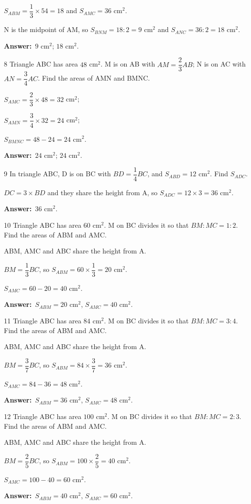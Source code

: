 \documentclass[11pt]{article}
\newif\ifsol \solfalse
\providecommand{\AnsWord}{Đáp số}
\newcommand{\dapso}[1]{\par\textbf{\AnsWord:}\ #1}
\newcommand{\probsol}[1]{%
  \begin{lrbox}{\solmeasure}\begin{minipage}{\dimexpr\linewidth-24pt\relax}#1\end{minipage}\end{lrbox}%
  \ifsol
    \begin{solbox}#1\end{solbox}%
  \else
    \setlength{\solht}{\dimexpr\ht\solmeasure+\dp\solmeasure+0.85cm\relax}%
    \ifdim\solht<1.35cm\setlength{\solht}{1.35cm}\fi
    \begin{tcolorbox}[colback=white,colframe=Line,boxrule=0.8pt,arc=5pt,
      left=8pt,right=8pt,top=4pt,bottom=4pt,height=\solht]{\footnotesize\color{Slate}\itshape\WorkWord}\end{tcolorbox}%
  \fi}
\newcommand{\gap}{\vspace{0.3cm}}
\def\WorkWord{Your work:}
\def\AnsWord{Answer}
\begin{document}
\probsol{
$S_{ABM}=\dfrac13\times54=18$ and $S_{AMC}=36$ cm$^2$.\par N is the midpoint of AM, so $S_{BNM}=18:2=9$ cm$^2$ and $S_{ANC}=36:2=18$ cm$^2$.
\dapso{$9$ cm$^2$; $18$ cm$^2$.}}
\gap
\begin{probbox}{8}{\relax}
Triangle ABC has area $48$ cm$^2$. M is on AB with $AM=\dfrac23AB$; N is on AC with $AN=\dfrac34AC$. Find the areas of AMN and BMNC.
\end{probbox}
\probsol{
$S_{AMC}=\dfrac23\times48=32$ cm$^2$;\par $S_{AMN}=\dfrac34\times32=24$ cm$^2$;\par $S_{BMNC}=48-24=24$ cm$^2$.
\dapso{$24$ cm$^2$; $24$ cm$^2$.}}
\gap
\begin{probbox}{9}{\relax}
In triangle ABC, D is on BC with $BD=\dfrac14BC$, and $S_{ABD}=12$ cm$^2$. Find $S_{ADC}$.
\end{probbox}
\probsol{
$DC=3\times BD$ and they share the height from A, so $S_{ADC}=12\times3=36$ cm$^2$.
\dapso{$36$ cm$^2$.}}
\gap
\begin{probbox}{10}{\relax}
Triangle ABC has area $60$ cm$^2$. M on BC divides it so that $BM:MC=1:2$. Find the areas of ABM and AMC.
\end{probbox}
\probsol{
ABM, AMC and ABC share the height from A.\par $BM=\dfrac{1}{3}BC$, so $S_{ABM}=60\times\dfrac{1}{3}=20$ cm$^2$.\par $S_{AMC}=60-20=40$ cm$^2$.
\dapso{$S_{ABM}=20$ cm$^2$, $S_{AMC}=40$ cm$^2$.}}
\gap
\begin{probbox}{11}{\relax}
Triangle ABC has area $84$ cm$^2$. M on BC divides it so that $BM:MC=3:4$. Find the areas of ABM and AMC.
\end{probbox}
\probsol{
ABM, AMC and ABC share the height from A.\par $BM=\dfrac{3}{7}BC$, so $S_{ABM}=84\times\dfrac{3}{7}=36$ cm$^2$.\par $S_{AMC}=84-36=48$ cm$^2$.
\dapso{$S_{ABM}=36$ cm$^2$, $S_{AMC}=48$ cm$^2$.}}
\gap
\begin{probbox}{12}{\relax}
Triangle ABC has area $100$ cm$^2$. M on BC divides it so that $BM:MC=2:3$. Find the areas of ABM and AMC.
\end{probbox}
\probsol{
ABM, AMC and ABC share the height from A.\par $BM=\dfrac{2}{5}BC$, so $S_{ABM}=100\times\dfrac{2}{5}=40$ cm$^2$.\par $S_{AMC}=100-40=60$ cm$^2$.
\dapso{$S_{ABM}=40$ cm$^2$, $S_{AMC}=60$ cm$^2$.}}
\end{document}
